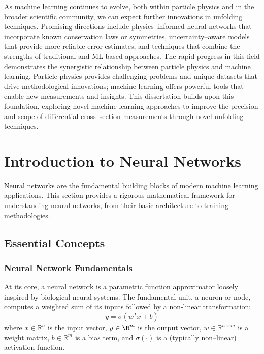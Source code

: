 As machine learning continues to evolve, both within particle physics and in the broader scientific community, we can expect further innovations in unfolding techniques.
%
Promising directions include physics--informed neural networks that incorporate known conservation laws or symmetries\kd{}, uncertainty--aware models that provide more reliable error estimates\kd{}, and techniques that combine the strengths of traditional and ML-based approaches\kd{}.
%
The rapid progress in this field demonstrates the synergistic relationship between particle physics and machine learning.
%
Particle physics provides challenging problems and unique datasets that drive methodological innovations;
%
machine learning offers powerful tools that enable new measurements and insights.
%
This dissertation builds upon this foundation, exploring novel machine learning approaches to improve the precision and scope of differential cross--section measurements through novel unfolding techniques.

\section{Introduction to Neural Networks}
Neural networks are the fundamental building blocks of modern machine learning applications.
%
This section provides a rigorous mathematical framework for understanding neural networks, from their basic architecture to training methodologies.

    \subsection{Essential Concepts}
        \subsubsection{Neural Network Fundamentals}
            At its core, a neural network is a parametric function approximator loosely inspired by biological neural systems.
            The fundamental unit, a neuron or node, computes a weighted sum of its inputs followed by a non-linear transformation:
            \begin{equation}
            y = \sigma(w^T x + b)
            \end{equation}
            where \(x \in \mathbb{R}^n\) is the input vector, \(y\in\R^{m}\) is the output vector, \(w \in \mathbb{R}^{n\times m}\) is a weight matrix, \(b \in \mathbb{R}^m\) is a bias term, and \(\sigma(\cdot)\) is a (typically non--linear) activation function.
            
